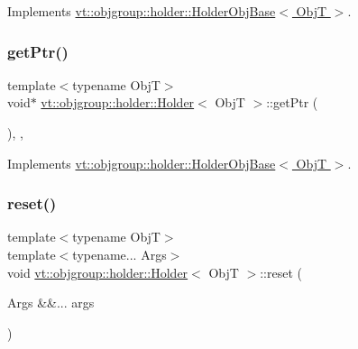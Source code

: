 Implements \hyperlink{structvt_1_1objgroup_1_1holder_1_1_holder_obj_base_a4b350b0126259d31a62fd426a08f6698}{vt\+::objgroup\+::holder\+::\+Holder\+Obj\+Base$<$ Obj\+T $>$}.

\mbox{\label{structvt_1_1objgroup_1_1holder_1_1_holder_a856859dca0c0ee3fb6ebace444a36200}} 
\subsubsection{\texorpdfstring{get\+Ptr()}{getPtr()}}
{\footnotesize\ttfamily template$<$typename ObjT$>$ \\
void$\ast$ \hyperlink{structvt_1_1objgroup_1_1holder_1_1_holder}{vt\+::objgroup\+::holder\+::\+Holder}$<$ ObjT $>$\+::get\+Ptr (\begin{DoxyParamCaption}{ }\end{DoxyParamCaption})\hspace{0.3cm}{\ttfamily [inline]}, {\ttfamily [override]}, {\ttfamily [virtual]}}



Implements \hyperlink{structvt_1_1objgroup_1_1holder_1_1_holder_obj_base_aa08fdb3d076043c004e3674a136f84c3}{vt\+::objgroup\+::holder\+::\+Holder\+Obj\+Base$<$ Obj\+T $>$}.

\mbox{\label{structvt_1_1objgroup_1_1holder_1_1_holder_a4ce99c48b611a65189a6891c780b6500}} 
\subsubsection{\texorpdfstring{reset()}{reset()}}
{\footnotesize\ttfamily template$<$typename ObjT$>$ \\
template$<$typename... Args$>$ \\
void \hyperlink{structvt_1_1objgroup_1_1holder_1_1_holder}{vt\+::objgroup\+::holder\+::\+Holder}$<$ ObjT $>$\+::reset (\begin{DoxyParamCaption}\item[{Args \&\&...}]{args }\end{DoxyParamCaption})\hspace{0.3cm}{\ttfamily [inline]}}



